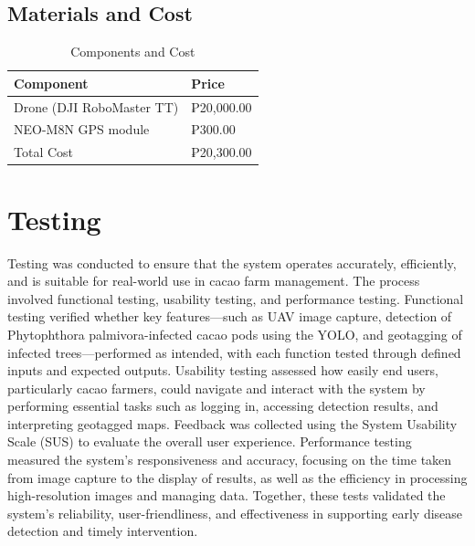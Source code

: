   
\subsection{Materials and Cost}

\begin{table}[H]
	\centering
	\caption{Components and Cost}
	\label{tab:components}
	\begin{tabular}{ll}
		\toprule
		Component                 & Price      \\
		\midrule
		Drone (DJI RoboMaster TT) & ₱20,000.00 \\
		\midrule
		NEO-M8N GPS module        & ₱300.00    \\
		\midrule
		Total Cost                & ₱20,300.00 \\
		\bottomrule
	\end{tabular}
\end{table}
	
	\section{Testing} 
	Testing was conducted to ensure that the system operates accurately, efficiently, and is suitable for real-world use in cacao farm management. The process involved functional testing, usability testing, and performance testing. Functional testing verified whether key features—such as UAV image capture, detection of Phytophthora palmivora-infected cacao pods using the YOLO, and geotagging of infected trees—performed as intended, with each function tested through defined inputs and expected outputs. Usability testing assessed how easily end users, particularly cacao farmers, could navigate and interact with the system by performing essential tasks such as logging in, accessing detection results, and interpreting geotagged maps. Feedback was collected using the System Usability Scale (SUS) to evaluate the overall user experience. Performance testing measured the system’s responsiveness and accuracy, focusing on the time taken from image capture to the display of results, as well as the efficiency in processing high-resolution images and managing data. Together, these tests validated the system’s reliability, user-friendliness, and effectiveness in supporting early disease detection and timely intervention.
	
